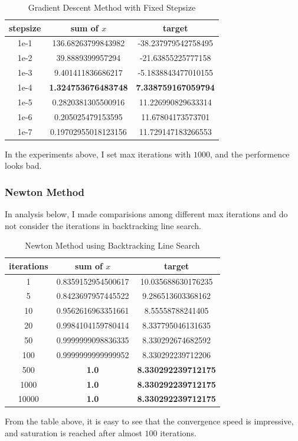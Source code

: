 \documentclass[12pt, a4paper, oneside]{article}
\begin{document}
\begin{table}[H]
    \begin{center}
      \caption{Gradient Descent Method with Fixed Stepsize}
      \begin{tabular}{c|c|c} %
        \textbf{stepsize} & \textbf{sum of $x$} & \textbf{target}\\
        \hline
        1e-1 & 136.68263799843982 & -38.237979542758495 \\
        1e-2 & 39.8889399957294 & -21.63855225777158 \\
        1e-3 & 9.401411836686217 & -5.1838843477010155 \\
        1e-4 & \textbf{1.324753676483748} & \textbf{7.338759167059794} \\
        1e-5 & 0.2820381305500916 & 11.226990829633314 \\
        1e-6 & 0.205025479153595 & 11.67804173573701 \\
        1e-7 & 0.19702955018123156 & 11.729147183266553 
      \end{tabular}
    \end{center}
\end{table}
In the experiments above, I set max iterations with $1000$, and the performence looks bad. 

\subsubsection{Newton Method}
In analysis below, I made comparisions among different max iterations and do not consider the iterations in backtracking line search.
\begin{table}[H]
    \begin{center}
      \caption{Newton Method using Backtracking Line Search}
      \begin{tabular}{c|c|c} %
        \textbf{iterations} & \textbf{sum of $x$} & \textbf{target}\\
        \hline
        1 & 0.8359152954500617 & 10.035688630176235 \\
        5 & 0.8423697957445522 & 9.286513603368162 \\
        10 & 0.9562616963351661 & 8.55558788241405 \\
        20 & 0.9984104159780414 & 8.337795046131635 \\
        50 & 0.9999999098836335 & 8.330292674682592 \\
        100 & 0.9999999999999952 & 8.330292239712206 \\
        500 & \textbf{1.0} & \textbf{8.330292239712175} \\
        1000 & \textbf{1.0} & \textbf{8.330292239712175} \\
        10000 & \textbf{1.0} & \textbf{8.330292239712175} 
      \end{tabular}
    \end{center}
\end{table}
From the table above, it is easy to see that the convergence speed is impressive, and saturation is reached after almost $100$ iterations. 
\end{document}
